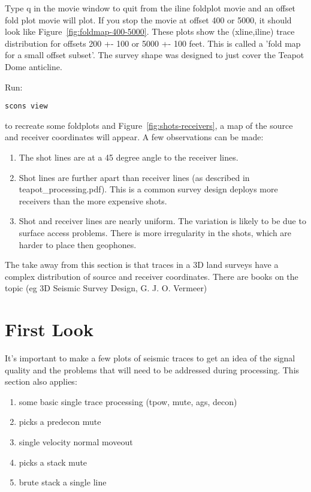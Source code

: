 Type q in the movie window to quit from the iline foldplot movie and an offset fold plot movie will plot.  If you stop the movie at offset 400 or 5000, it should look like Figure~\ref{fig:foldmap-400-5000}.  These plots show the (xline,iline) trace distribution for offsets 200 +- 100 or 5000 +- 100 feet.  This is called a 'fold map for a small offset subset'.  The survey shape was designed to just cover the Teapot Dome anticline.

Run:
\begin{verbatim}   
scons view
\end{verbatim}

to recreate some foldplots and Figure~\ref{fig:shots-receivers}, a map of the source and receiver coordinates will appear.  A few observations can be made:
\begin{enumerate}
\item The shot lines are at a 45 degree angle to the receiver lines.  
\item Shot lines are further apart than receiver lines (as described in teapot\_processing.pdf).  This is a common survey design deploys more receivers than the more expensive shots.
\item Shot and receiver lines are nearly uniform.  The variation is likely to be due to surface access problems.  There is more irregularity in the shots, which are harder to place then geophones.
\end{enumerate}

The take away from this section is that traces in a 3D land surveys have a complex distribution of source and receiver coordinates.  There are books on the topic (eg 3D Seismic Survey Design, G. J. O. Vermeer)





\section{First Look}
It's important to make a few plots of seismic traces to get an idea of the signal quality and the problems that will need to be addressed during processing.   This section also applies:
\begin{enumerate} 
\item some basic single trace processing (tpow, mute, ags, decon)
\item picks a predecon mute
\item single velocity normal moveout
\item picks a stack mute
\item brute stack a single line
\end{enumerate}

